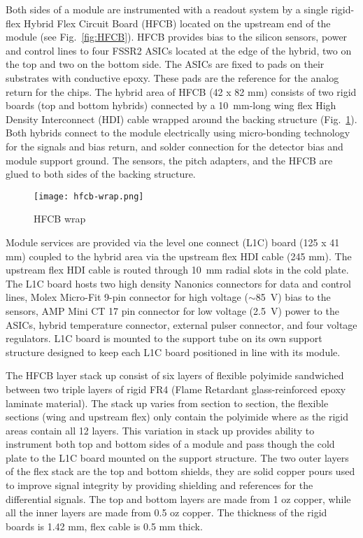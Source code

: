 Both sides of a module are instrumented with a readout system by a single rigid-flex Hybrid Flex Circuit Board (HFCB) located on the upstream end of the module (see Fig.~\ref{fig:HFCB}). HFCB provides bias to the silicon sensors, power and control lines to four FSSR2 ASICs located at the edge of the hybrid, two on the top and two on the bottom side. The ASICs are fixed to pads on their substrates with conductive epoxy. These pads are the reference for the analog return for the chips. The hybrid area of HFCB (42 x 82 mm) consists of two rigid boards (top and bottom hybrids) connected by a 10~mm-long wing flex High Density Interconnect (HDI) cable wrapped around the backing structure (Fig.~\ref{fig:hfcb-wrap}). Both hybrids connect to the module electrically using micro-bonding technology for the signals and bias return, and solder connection for the detector bias and module support ground. The sensors, the pitch adapters, and the HFCB are glued to both sides of the backing structure. 

\begin{figure}[hbt] 
\centering 
\texttt{[image: hfcb-wrap.png]}
\caption{HFCB wrap}
\label{fig:hfcb-wrap}
\end{figure}

Module services are provided via the level one connect (L1C) board (125 x 41 mm) coupled to the hybrid area via the upstream flex HDI cable (245 mm). The upstream flex HDI cable is routed through 10~mm radial slots in the cold plate. The L1C board hosts two high density Nanonics connectors for data and control lines, Molex Micro-Fit 9-pin connector for high voltage ($\sim$85~V) bias to the sensors, AMP Mini CT 17 pin connector for low voltage (2.5~V) power to the ASICs, hybrid temperature connector, external pulser connector, and four voltage regulators. L1C board is mounted to the support tube on its own support structure designed to keep each L1C board positioned in line with its module.

The HFCB layer stack up consist of six layers of flexible polyimide sandwiched between two triple layers of rigid FR4 (Flame Retardant glass-reinforced epoxy laminate material). The stack up varies from section to section, the flexible sections (wing and upstream flex) only contain the polyimide where as the rigid areas contain all 12 layers. This variation in stack up provides ability to instrument both top and bottom sides of a module and pass though the cold plate to the L1C board mounted on the support structure. The two outer layers of the flex stack are the top and bottom shields, they are solid copper pours used to improve signal integrity by providing shielding and references for the differential signals. The top and bottom layers are made from 1 oz copper, while all the inner layers are made from 0.5 oz copper. The thickness of the rigid boards is 1.42 mm, flex cable is 0.5 mm thick.


